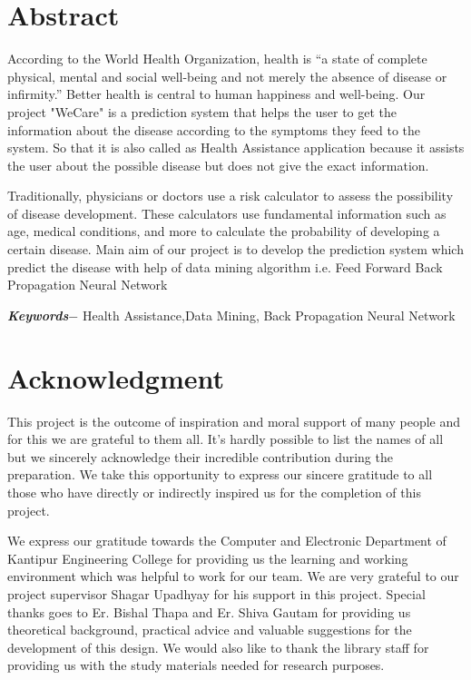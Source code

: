 \chapter*{Abstract} %
According to the World Health Organization, health is “a state of complete physical, mental and social well-being and not merely the absence of disease or infirmity.” Better health is central to human happiness and well-being. Our project "WeCare" is a prediction system that helps the user to get the information about the disease according to the symptoms they feed to the system. So that it is also called as Health Assistance application because it assists the user about the possible disease but does not give the exact information. 
\par
Traditionally, physicians or doctors use a risk calculator to assess the possibility of disease development. These calculators use fundamental information such as age, medical conditions, and more to calculate the probability of developing a certain disease.
    Main aim of our project is to develop the prediction system which predict the disease with help of data mining algorithm i.e. Feed Forward Back Propagation Neural Network 
\par
\textbf{\textit{Keywords$-$}} Health Assistance,Data Mining, Back Propagation Neural Network

\chapter*{Acknowledgment}
This project is the outcome of inspiration and moral support of many people and for this we are grateful to them all. It’s hardly possible to list the names of all but we sincerely acknowledge their incredible contribution during the preparation. We take this opportunity to express our sincere gratitude to all those who have directly or indirectly inspired us for the completion of this project.\par
We express our gratitude towards the Computer and Electronic Department of Kantipur Engineering College for providing us the learning and working environment which was helpful to work for our team. We are very grateful to our project supervisor Shagar Upadhyay for his support in this project. Special thanks goes to Er. Bishal Thapa and Er. Shiva Gautam for providing us theoretical background, practical advice and valuable suggestions for the development of this design. We would also like to thank the library staff for providing us with the study materials needed for research purposes.
\par
\begin{flushright}
\vskip -20pt
\submittedBy
\end{flushright}



